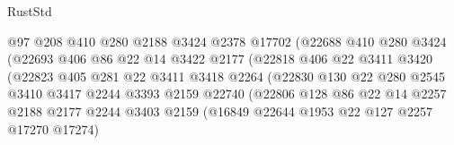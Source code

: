 \begin{lexlean}{RustStd}
\begin{coremodule}
                                    @97
                                    @208
                                    @410
                                    @280
                                    @2188
                                    @3424
                                    @2378
                                    @17702
                                    (@22688
                                      @410
                                      @280
                                      @3424
                                      (@22693
                                        @406
                                        @86
                                        @22
                                        @14
                                        @3422
                                        @2177
                                        (@22818
                                          @406
                                          @22
                                          @3411
                                          @3420
                                          (@22823
                                            @405
                                            @281
                                            @22
                                            @3411
                                            @3418
                                            @2264
                                            (@22830
                                              @130
                                              @22
                                              @280
                                              @2545
                                              @3410
                                              @3417
                                              @2244
                                              @3393
                                              @2159
                                              @22740
                                              (@22806
                                                @128
                                                @86
                                                @22
                                                @14
                                                @2257
                                                @2188
                                                @2177
                                                @2244
                                                @3403
                                                @2159
                                                (@16849 @22644 @1953 @22 @127 @2257 @17270 @17274)

\end{coremodule}
\end{lexlean}
